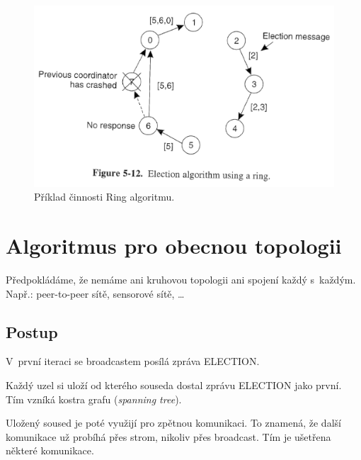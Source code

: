 \begin{figure}[H]
    \centering
    \includegraphics[width=1\linewidth]{example_ring.pdf}
    \caption{Příklad činnosti Ring algoritmu.}
\end{figure}


\section{Algoritmus pro obecnou topologii}

\begin{compactitem}
    \item Předpokládáme, že nemáme ani kruhovou topologii ani spojení každý s~každým. Např.: peer-to-peer sítě, sensorové sítě, \dots
\end{compactitem}

\subsection{Postup}

\begin{compactitem}
    \item V~první iteraci se broadcastem posílá zpráva ELECTION.
    \item Každý uzel si uloží od kterého souseda dostal zprávu ELECTION jako první. Tím vzníká kostra grafu (\textit{spanning tree}).
    \item Uložený soused je poté využijí pro zpětnou komunikaci. To znamená, že další komunikace už probíhá přes strom, nikoliv přes broadcast. Tím je ušetřena některé komunikace.
\end{compactitem}

